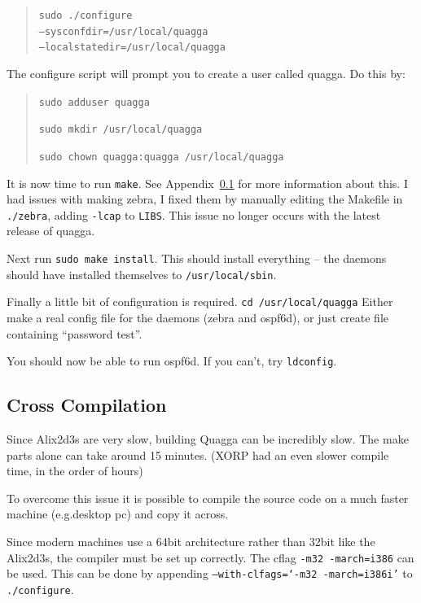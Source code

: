 \begin{quote}
\texttt{sudo \@./configure \\ --sysconfdir=/usr/local/quagga \\ --localstatedir=/usr/local/quagga}
\end{quote}

The configure script will prompt you to create a user called quagga. Do this by:

\begin{quote}
\texttt{sudo adduser quagga}

\texttt{sudo mkdir /usr/local/quagga}

\texttt{sudo chown quagga:quagga /usr/local/quagga}
\end{quote}

It is now time to run \texttt{make}. See Appendix~\ref{cross_compile} for more
information about this. I had issues with making zebra, I fixed them by
manually editing the Makefile in \texttt{\@./zebra}, adding \texttt{-lcap} to
\texttt{LIBS}\@. This issue no longer occurs with the latest release of quagga.

Next run \texttt{sudo make install}. This should install everything -- the daemons
should have installed themselves to \texttt{/usr/local/sbin}.

Finally a little bit of configuration is required. \texttt{cd
/usr/local/quagga} Either make a real config file for the daemons (zebra and
ospf6d), or just create file containing ``password test''.

You should now be able to run ospf6d. If you can't, try \texttt{ldconfig}.

\subsection{Cross Compilation}
\label{cross_compile}
Since Alix2d3s are very slow, building Quagga can be incredibly slow. The make
parts alone can take around 15 minutes. (XORP had an even slower compile time,
in the order of hours) 

To overcome this issue it is possible to compile the source code on a much
faster machine (e.g.\@ desktop pc) and copy it across. 

Since modern machines use a 64bit architecture rather than 32bit like the
Alix2d3s, the compiler must be set up correctly. The cflag \texttt{-m32
-march=i386} can be used. This can be done by appending
\texttt{--with-clfags=`-m32 -march=i386i'} to \texttt{\@./configure}.

